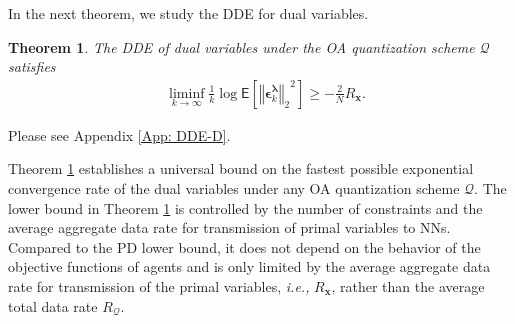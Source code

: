 \documentclass[10pt,twocolumn,twoside]{IEEEtran}
\newtheorem{theorem}{Theorem}
\begin{document}
In the next theorem, we study the DDE for dual variables.
\begin{theorem}\label{Theo: DDE-D}
The DDE of dual variables under the OA quantization scheme $\mathcal{Q}$ satisfies 
\begin{align}
&\liminf_{k\rightarrow\infty}\frac{1}{k}\log{\ensuremath{\mathsf{E}\left[{{\left\Vert{{\ensuremath{\boldsymbol{{\epsilon}}}}^{{\ensuremath{\boldsymbol{{\lambda}}}}}_k}\right\Vert_{{2}}}^2} \right]}}\geq-\frac{2}{N}R_{{\ensuremath{\boldsymbol{{x}}}}}.
\end{align}
\end{theorem}
\begin{IEEEproof}
Please see Appendix \ref{App: DDE-D}.
\end{IEEEproof}
Theorem \ref{Theo: DDE-D} establishes a universal  bound on the fastest possible exponential convergence rate of the dual variables under any OA quantization  scheme $\mathcal{Q}$. The lower bound in Theorem \ref{Theo: DDE-D} is controlled by the number of constraints and the average aggregate data rate for transmission of primal variables to NNs. Compared to the PD lower bound, it does not depend on the behavior of the objective functions of agents and is only limited by the average aggregate data rate for transmission of the primal variables, \emph{i.e.,} $R_{{\ensuremath{\boldsymbol{{x}}}}}$, rather than the average total data rate  $R_{\mathcal{Q}}$. 
\end{document}
